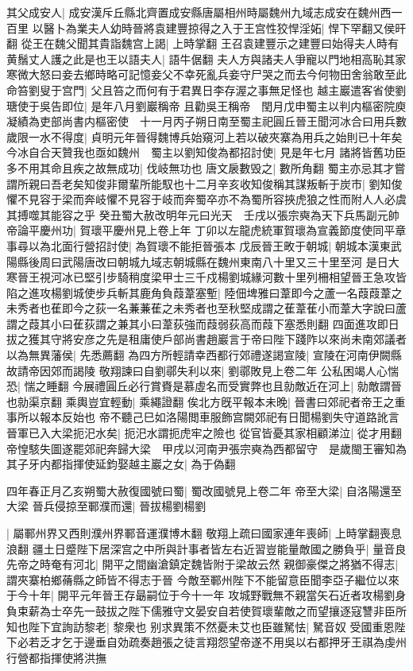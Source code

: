 其父成安人|{
	成安漢斥丘縣北齊置成安縣唐屬相州時屬魏州九域志成安在魏州西一百里}
以醫卜為業夫人幼時晉將袁建豐掠得之入于王宫性狡悍淫妬|{
	悍下罕翻又侯旰翻}
從王在魏父聞其貴詣魏宫上謁|{
	上時掌翻}
王召袁建豐示之建豐曰始得夫人時有黄鬚丈人護之此是也王以語夫人|{
	語牛倨翻}
夫人方與諸夫人爭寵以門地相高恥其家寒微大怒曰妾去鄉時略可記憶妾父不幸死亂兵妾守尸哭之而去今何物田舍翁敢至此命笞劉叟于宫門|{
	父且笞之而何有于君異日李存渥之事無足怪也}
越主巖遣客省使劉瑭使于吳告即位|{
	是年八月劉巖稱帝}
且勸吳王稱帝　閏月戊申蜀主以判内樞密院庾凝績為吏部尚書内樞密使　十一月丙子朔日南至蜀主祀圓丘晉王聞河冰合曰用兵數歲限一水不得度|{
	貞明元年晉得魏博兵始窺河上若以破夾寨為用兵之始則已十年矣}
今冰自合天贊我也亟如魏州　蜀主以劉知俊為都招討使|{
	見是年七月}
諸將皆舊功臣多不用其命且疾之故無成功|{
	伐岐無功也}
唐文扆數毁之|{
	數所角翻}
蜀主亦忌其才嘗謂所親曰吾老矣知俊非爾輩所能馭也十二月辛亥收知俊稱其謀叛斬于炭市|{
	劉知俊懼不見容于梁而奔岐懼不見容于岐而奔蜀卒亦不為蜀所容挾虎狼之性而附人人必虞其搏噬其能容之乎}
癸丑蜀大赦改明年元曰光天　壬戌以張宗奭為天下兵馬副元帥　帝論平慶州功|{
	賀瓌平慶州見上卷上年}
丁卯以左龍虎統軍賀瓌為宣義節度使同平章事尋以為北面行營招討使|{
	為賀瓌不能拒晉張本}
戊辰晉王畋于朝城|{
	朝城本漢東武陽縣後周曰武陽唐改曰朝城九域志朝城縣在魏州東南八十里又三十里至河}
是日大寒晉王視河冰已堅引步騎稍度梁甲士三千戍楊劉城緣河數十里列柵相望晉王急攻皆陷之進攻楊劉城使步兵斬其鹿角負葭葦塞塹|{
	陸佃埤雅曰葦即今之蘆一名葭葭葦之未秀者也萑即今之荻一名蒹蒹萑之未秀者也至秋堅成謂之萑葦萑小而葦大字說曰蘆謂之葭其小曰萑荻謂之兼其小曰葦荻強而葭弱荻高而葭下塞悉則翻}
四面進攻即日拔之獲其守將安彦之先是租庸使戶部尚書趙巖言于帝曰陛下踐阼以來尚未南郊議者以為無異藩侯|{
	先悉薦翻}
為四方所輕請幸西都行郊禮遂謁宣陵|{
	宣陵在河南伊闕縣故請帝因郊而謁陵}
敬翔諫曰自劉鄩失利以來|{
	劉鄩敗見上卷二年}
公私困竭人心惴恐|{
	惴之睡翻}
今展禮圓丘必行賞賚是慕虛名而受實弊也且勍敵近在河上|{
	勍敵謂晉也勍渠京翻}
乘輿豈宜輕動|{
	乘繩證翻}
俟北方旣平報本未晚|{
	晉書曰郊祀者帝王之重事所以報本反始也}
帝不聽己巳如洛陽閲車服飾宫闕郊祀有日聞楊劉失守道路訛言晉軍已入大梁扼汜水矣|{
	扼汜水謂扼虎牢之險也}
從官皆憂其家相顧涕泣|{
	從才用翻}
帝惶駭失圖遂罷郊祀奔歸大梁　甲戌以河南尹張宗奭為西都留守　是歲閩王審知為其子牙内都指揮使延鈞娶越主巖之女|{
	為于偽翻}


四年春正月乙亥朔蜀大赦復國號曰蜀|{
	蜀改國號見上卷二年}
帝至大梁|{
	自洛陽還至大梁}
晉兵侵掠至鄆濮而還|{
	晉拔楊劉楊劉}


|{
	屬鄆州界又西則濮州界鄆音運濮博木翻}
敬翔上疏曰國家連年喪師|{
	上時掌翻喪息浪翻}
疆土日蹙陛下居深宫之中所與計事者皆左右近習豈能量敵國之勝負乎|{
	量音良}
先帝之時奄有河北|{
	開平之間幽滄鎮定魏皆附于梁故云然}
親御豪傑之將猶不得志|{
	謂夾寨柏鄉蓨縣之師皆不得志于晉}
今敵至鄆州陛下不能留意臣聞李亞子繼位以來于今十年|{
	開平元年晉王存朂嗣位于今十一年}
攻城野戰無不親當矢石近者攻楊劉身負束薪為士卒先一鼓拔之陛下儒雅守文晏安自若使賀瓌輩敵之而望攘逐寇讐非臣所知也陛下宜詢訪黎老|{
	黎衆也}
别求異策不然憂未艾也臣雖駑怯|{
	駑音奴}
受國重恩陛下必若乏才乞于邊垂自効疏奏趙張之徒言翔怨望帝遂不用吳以右都押牙王祺為虔州行營都指揮使將洪撫

